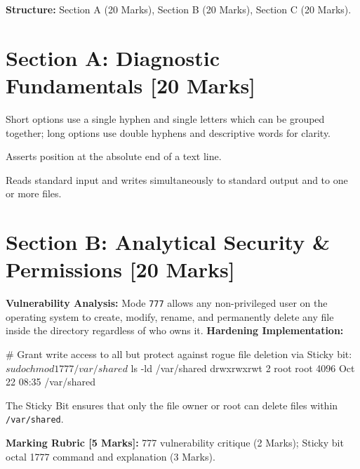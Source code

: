 
\begin{markingrubric}
\textbf{Structure:} Section A (20 Marks), Section B (20 Marks), Section C (20 Marks).
\end{markingrubric}

\section*{Section A: Diagnostic Fundamentals [20 Marks]}

\begin{examsol}
Short options use a single hyphen and single letters which can be grouped together; long options use double hyphens and descriptive words for clarity.
\end{examsol}

\begin{examsol}
Asserts position at the absolute end of a text line.
\end{examsol}

\begin{examsol}
Reads standard input and writes simultaneously to standard output and to one or more files.
\end{examsol}

\section*{Section B: Analytical Security \& Permissions [20 Marks]}


\begin{examsol}
\textbf{Vulnerability Analysis:} Mode \texttt{777} allows any non-privileged user on the operating system to create, modify, rename, and permanently delete any file inside the directory regardless of who owns it.
\textbf{Hardening Implementation:}
\begin{examcli}
# Grant write access to all but protect against rogue file deletion via Sticky bit:
$ sudo chmod 1777 /var/shared
$ ls -ld /var/shared
drwxrwxrwt 2 root root 4096 Oct 22 08:35 /var/shared
\end{examcli}
The Sticky Bit ensures that only the file owner or root can delete files within \texttt{/var/shared}.

\begin{markingrubric}
\textbf{Marking Rubric [5 Marks]:} 777 vulnerability critique (2 Marks); Sticky bit octal 1777 command and explanation (3 Marks).
\end{markingrubric}
\end{examsol}

